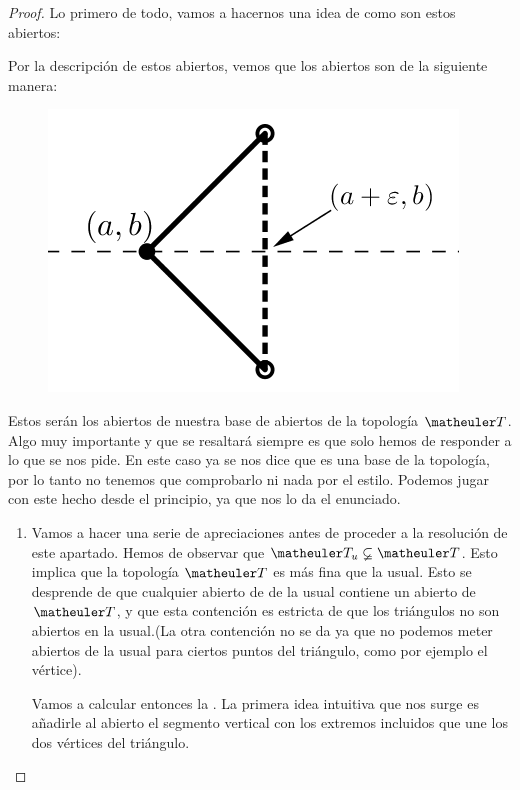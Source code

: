 \begin{proof}
	Lo primero de todo, vamos a hacernos una idea de como son estos abiertos:
	
	Por la descripción de estos abiertos, vemos que los abiertos son de la siguiente manera:
	\begin{figure}[h!]
		\centering
		\includegraphics[scale = 1.5]{img/ExamenSeptiembre2017/Abiertosimg}
	\end{figure}
	Estos serán los abiertos de nuestra base de abiertos de la topología $\T$.
	Algo muy importante y que se resaltará siempre es que solo hemos de responder a lo que se nos pide. En este caso ya se nos dice que es una base de la topología, por lo tanto no tenemos que comprobarlo ni nada por el estilo. Podemos jugar con este hecho desde el principio, ya que nos lo da el enunciado.
	\begin{enumerate}
		\item Vamos a hacer una serie de apreciaciones antes de proceder a la resolución de este apartado. Hemos de observar que $\T_u \varsubsetneq \T$. Esto implica que la topología $\T$ es más fina que la usual. Esto se desprende de que cualquier abierto de de la usual contiene un abierto de $\T$, y que esta contención es estricta de que los triángulos no son abiertos en la usual.(La otra contención no se da ya que no podemos meter abiertos de la usual para ciertos puntos del triángulo, como por ejemplo el vértice).
		
		Vamos a calcular entonces la . La primera idea intuitiva que nos surge es añadirle al abierto el segmento vertical con los extremos incluidos que une los dos vértices del triángulo.
		

\end{enumerate}
\end{proof}
